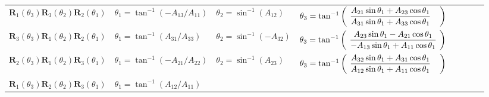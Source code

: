 \begin{landscape}
\begin{table}[h]
\begin{tabular}{llllllll}
        \footnotesize
        $\mathbf{R}_1(\theta_3)\mathbf{R}_3(\theta_2)\mathbf{R}_2(\theta_1)$
        &
        \footnotesize
        $\theta_1 =  \tan^{-1}(-A_{13}/A_{11})$
        &
        \footnotesize
        $\theta_2 =  \sin^{-1}(A_{12})$
        &
        \footnotesize
        $\theta_3  = \tan^{-1}\left(\hspace{0.05 in}\displaystyle\frac{A_{21}\sin{\theta_1}+ A_{23}\cos{\theta_1}}{A_{31}\sin{\theta_1}+
        A_{33}\cos{\theta_1}}\hspace{0.15 in}\right) \vspace{.1 in}$\\
        \footnotesize
        $\mathbf{R}_3(\theta_3)\mathbf{R}_1(\theta_2)\mathbf{R}_2(\theta_1)$
        &
        \footnotesize
        $\theta_1 =  \tan^{-1}(A_{31}/A_{33})$
        &
        \footnotesize
        $\theta_2 =  \sin^{-1}(-A_{32})$
        &
        \footnotesize
        $\theta_3  = \tan^{-1}\left(\hspace{0.05 in}\displaystyle\frac{A_{23}\sin{\theta_1}- A_{21}\cos{\theta_1}}{-A_{13}\sin{\theta_1}+
        A_{11}\cos{\theta_1}}\hspace{0.05 in}\right) \vspace{.1 in} $\\
        \footnotesize
        $\mathbf{R}_2(\theta_3)\mathbf{R}_1(\theta_2)\mathbf{R}_3(\theta_1)$
        &
        \footnotesize
        $\theta_1 =  \tan^{-1}(-A_{21}/A_{22})$
        &
        \footnotesize
        $\theta_2 =  \sin^{-1}(A_{23})$
        &
        \footnotesize
        $\theta_3  = \tan^{-1}\left(\hspace{0.05 in}\displaystyle\frac{A_{32}\sin{\theta_1}+ A_{31}\cos{\theta_1}}{A_{12}\sin{\theta_1}+
        A_{11}\cos{\theta_1}}\hspace{0.15 in}\right) \vspace{.1 in}$\\
        \footnotesize
        $\mathbf{R}_1(\theta_3)\mathbf{R}_2(\theta_2)\mathbf{R}_3(\theta_1)$
        &
        \footnotesize
        $\theta_1 =  \tan^{-1}(A_{12}/A_{11})$
        &
        \footnotesize

\end{tabular}
\end{table}
\end{landscape}
